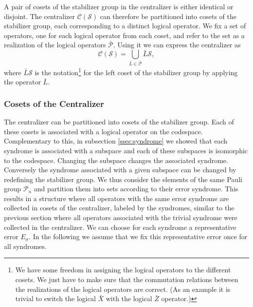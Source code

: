 A pair of cosets of the stabilizer group in the centralizer is either identical or disjoint.
The centralizer $\mathcal{C}(\mathcal{S})$ can therefore be partitioned into cosets of the stabilizer group, each corresponding to a distinct logical operator.
We fix a set of operators, one for each logical operator from each coset, and refer to the set as a realization of the logical operators $\bar{\mathcal{P}}$. 
Using it we can express the centralizer as 
\begin{equation}
    \mathcal{C}(\mathcal{S}) = \bigcup_{\bar{L} \in\bar{\mathcal{P}}} \bar{L}\mathcal{S},
    \label{eq:centralizer_partitioned_into_cosets_of_stabilizer_group}
\end{equation}
where $\bar{L}\mathcal{S}$ is the notation\footnote{
    We have some freedom in assigning the logical operators to the different cosets.
    We just have to make sure that the commutation relations between the realizations of the logical operators are correct.
    (As an example it is trivial to switch the logical $\bar{X}$ with the logical $\bar{Z}$ operator.)
} for the left coset of the stabilizer group by applying the operator $\bar{L}$.


\subsubsection{Cosets of the Centralizer}\label{ssec:cosets_of_the_centralizer}

The centralizer can be partitioned into cosets of the stabilizer group.
Each of these cosets is associated with a logical operator on the codespace.
Complementary to this, in subsection \ref{ssec:syndrome} we showed that each syndrome is associated with a subspace and each of these subspaces is isomorphic to the codespace.
Changing the subspace changes the associated syndrome.
Conversely the syndrome associated with a given subspace can be changed by redefining the stabilizer group.
We thus consider the elements of the same Pauli group $\mathcal{P}_n$ and partition them into sets according to their error syndrome.
This results in a structure where all operators with the same error syndrome are collected in cosets of the centralizer, 
labeled by the syndromes, similar to the previous section where all operators associated with the trivial syndrome were collected in the centralizer.
We can choose for each syndrome a representative error $E_{\sigma}$.
In the following we assume that we fix this representative error once for all syndromes.

